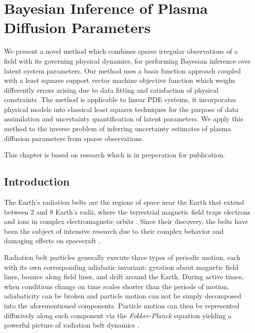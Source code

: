 \chapter{Bayesian Inference of Plasma Diffusion Parameters}\label{chapter:bayes_diff_chapter}

{\small
  We present a novel method which combines sparse irregular observations of a field with its governing 
  physical dynamics, for performing Bayesian inference over latent system parameters. Our method uses 
  a basis function approach coupled with a least squares support vector machine objective function which 
  weighs differently errors arising due to data fitting and satisfaction of physical constraints. The method 
  is applicable to linear PDE systems, it incorporates physical models into classical least squares techniques 
  for the purpose of data assimilation and uncertainty quantification of latent parameters. We apply this method 
  to the inverse problem of inferring uncertainty estimates of plasma diffusion parameters from sparse observations.
}

\vfill
{}
\vfill

\noindent
    \parbox{\textwidth}{%
        {\small This chapter is based on research which is in preperation for publication.}
    }%


\clearpage


\section{Introduction}

The Earth's radiation belts are the regions of space near 
the Earth that extend between 2 and 8 Earth's radii, where the terrestrial magnetic field traps 
electrons and ions in complex electromagnetic orbits  \citep{vanAllen}. Since their discovery,
the belts have been the subject of intensive research due to their complex behavior
and damaging effects on spacecraft \citep{GUBBY20021723, WellingSatellite, baker2002}.

Radiation belt particles generally execute three types of periodic motion, 
each with its own corresponding adiabatic invariant: 
gyration about magnetic field lines, bounce along field lines, 
and drift around the Earth. During active times, when conditions 
change on time scales shorter than the periods of motion, 
adiabaticity can be broken and particle motion can not be
simply decomposed into the aforementioned components. Particle motion 
can then be represented diffusively along each component via the 
\emph{Fokker-Planck} equation yielding a powerful picture of 
radiation belt dynamics \citep{schulz2012particle}.

